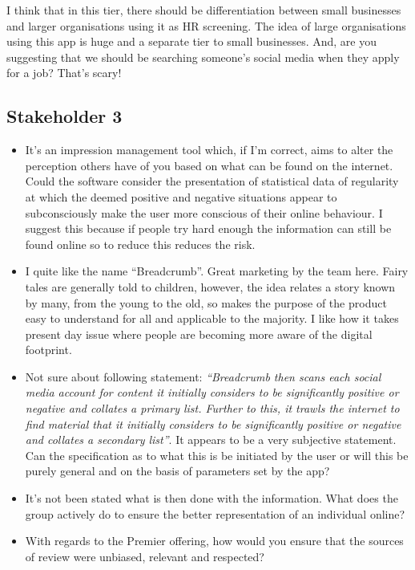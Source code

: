       I think that in this tier, there should be differentiation between small businesses and larger organisations using it as HR screening. The idea of large organisations using this app is huge and a separate tier to small businesses. And, are you suggesting that we should be searching someone's social media when they apply for a job? That's scary!

  \subsection{Stakeholder 3}

    \begin{itemize}
      \item It's an impression management tool which, if I'm correct, aims to alter the perception others have of you based on what can be found on the internet. Could the software consider the presentation of statistical data of regularity at which the deemed positive and negative situations appear to subconsciously make the user more conscious of their online behaviour. I suggest this because if people try hard enough the information can still be found online so to reduce this reduces the risk.
      \item I quite like the name ``Breadcrumb''. Great marketing by the team here. Fairy tales are generally told to children, however, the idea relates a story known by many, from the young to the old, so makes the purpose of the product easy to understand for all and applicable to the majority. I like how it takes present day issue where people are becoming more aware of the digital footprint.
      \item Not sure about following statement: \emph{``Breadcrumb then scans each social media account for content it initially considers to be significantly positive or negative and collates a primary list. Further to this, it trawls the internet to find material that it initially considers to be significantly positive or negative and collates a secondary list''}. It appears to be a very subjective statement. Can the specification as to what this is be initiated by the user or will this be purely general and on the basis of parameters set by the app?
      \item It's not been stated what is then done with the information. What does the group actively do to ensure the better representation of an individual online?
      \item With regards to the Premier offering, how would you ensure that the sources of review were unbiased, relevant and respected?
    \end{itemize}

